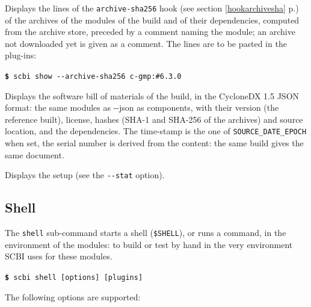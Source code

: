 \documentclass[a4paper,12pt,twoside]{article}
\newcommand{\code}[1]{\texttt{#1}}
\newcommand{\seeref}[1]{see section \ref{#1} p.\pageref{#1}}
\newcommand{\cmd}[1]{\tabto{1cm}\hspace{0.5cm}\texttt{\textbf{\$} #1}}
\newcommand{\ddash}{-{}-}
\begin{document}
\begin{description}[font=\texttt]
	\item[\ddash{}archive-sha256] Displays the lines of the \code{archive-sha256} hook (\seeref{hookarchivesha}) of the archives of the modules of the build and of their dependencies, computed from the archive store, preceded by a comment naming the module; an archive not downloaded yet is given as a comment. The lines are to be pasted in the plug-ins:

	\cmd{scbi show \ddash{}archive-sha256 c-gmp:\#6.3.0}

	\item[\ddash{}sbom] Displays the software bill of materials of the build, in the CycloneDX 1.5 JSON format: the same modules as \ddash{}json as components, with their version (the reference built), license, hashes (SHA-1 and SHA-256 of the archives) and source location, and the dependencies. The time-stamp is the one of \code{SOURCE\_DATE\_EPOCH} when set, the serial number is derived from the content: the same build gives the same document.

	\item[\ddash{}stat] Displays the setup (see the \code{\ddash{}stat} option).
\end{description}

\subsection{Shell}
\label{shell}

The \code{shell} sub-command starts a shell (\code{\$SHELL}), or runs a command, in the environment of the modules: to build or test by hand in the very environment SCBI uses for these modules.

\cmd{scbi shell [options] [plugins]}

The following options are supported:
\end{document}
